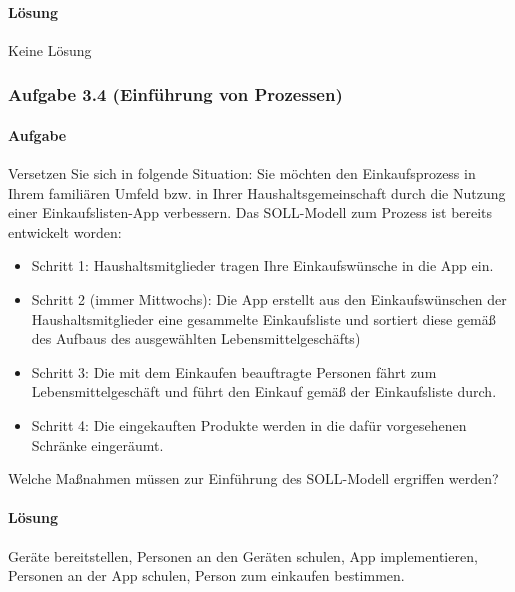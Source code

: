 \paragraph*{Lösung}
    Keine Lösung


\subsubsection*{Aufgabe 3.4 (Einführung von Prozessen)}
\paragraph*{Aufgabe}
    Versetzen Sie sich in folgende Situation: Sie möchten den Einkaufsprozess in Ihrem familiären Umfeld bzw. in Ihrer Haushaltsgemeinschaft durch die Nutzung einer Einkaufslisten-App verbessern. Das SOLL-Modell zum Prozess ist bereits entwickelt worden:
   
    \begin{itemize}
        \item Schritt 1: Haushaltsmitglieder tragen Ihre Einkaufswünsche in die App ein.
        \item Schritt 2 (immer Mittwochs): Die App erstellt aus den Einkaufswünschen der Haushaltsmitglieder eine gesammelte Einkaufsliste und sortiert diese gemäß des Aufbaus des ausgewählten Lebensmittelgeschäfts)
        \item Schritt 3: Die mit dem Einkaufen beauftragte Personen fährt zum Lebensmittelgeschäft und führt den Einkauf gemäß der Einkaufsliste durch.
        \item Schritt 4: Die eingekauften Produkte werden in die dafür vorgesehenen Schränke eingeräumt.
    \end{itemize}

    Welche Maßnahmen müssen zur Einführung des SOLL-Modell ergriffen werden?
\paragraph*{Lösung}
    Geräte bereitstellen, Personen an den Geräten schulen, App implementieren, Personen an der App schulen, Person zum einkaufen bestimmen.

